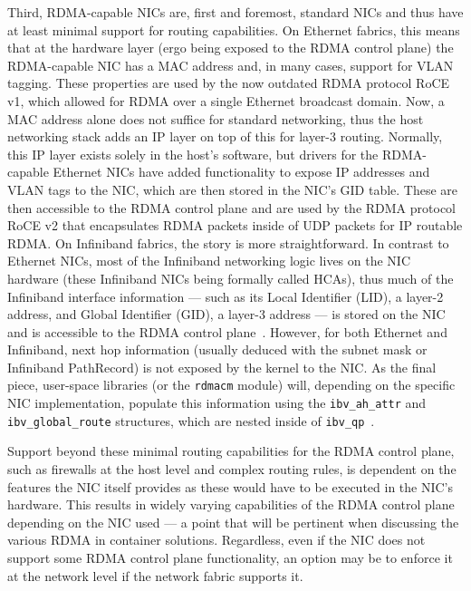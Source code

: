 \documentclass[12pt,titlepage]{article}
\begin{document}
Third, RDMA-capable NICs are, first and foremost, standard NICs and thus have at least minimal support for routing capabilities.
On Ethernet fabrics, this means that at the hardware layer (ergo being exposed to the RDMA control plane) the RDMA-capable NIC has a MAC address and, in many cases, support for VLAN tagging.
These properties are used by the now outdated RDMA protocol RoCE v1, which allowed for RDMA over a single Ethernet broadcast domain.
Now, a MAC address alone does not suffice for standard networking, thus the host networking stack adds an IP layer on top of this for layer-3 routing.
Normally, this IP layer exists solely in the host's software, but drivers for the RDMA-capable Ethernet NICs have added functionality to expose IP addresses and VLAN tags to the NIC, which are then stored in the NIC's GID table.
These are then accessible to the RDMA control plane and are used by the RDMA protocol RoCE v2 that encapsulates RDMA packets inside of UDP packets for IP routable RDMA\@.
On Infiniband fabrics, the story is more straightforward.
In contrast to Ethernet NICs, most of the Infiniband networking logic lives on the NIC hardware (these Infiniband NICs being formally called HCAs), thus much of the Infiniband interface information --- such as its Local Identifier (LID), a layer-2 address, and Global Identifier (GID), a layer-3 address --- is stored on the NIC and is accessible to the RDMA control plane~\cite{mlnxofedmanual}.
However, for both Ethernet and Infiniband, next hop information (usually deduced with the subnet mask or Infiniband PathRecord) is not exposed by the kernel to the NIC\@.
As the final piece, user-space libraries (or the \texttt{rdmacm} module) will, depending on the specific NIC implementation, populate this information using the \texttt{ibv\_ah\_attr} and \texttt{ibv\_global\_route} structures, which are nested inside of \texttt{ibv\_qp}~\cite{rdmaawareprogramming,infinibandarch,rdmacorerepo}.

Support beyond these minimal routing capabilities for the RDMA control plane, such as firewalls at the host level and complex routing rules, is dependent on the features the NIC itself provides as these would have to be executed in the NIC's hardware.
This results in widely varying capabilities of the RDMA control plane depending on the NIC used --- a point that will be pertinent when discussing the various RDMA in container solutions.
Regardless, even if the NIC does not support some RDMA control plane functionality, an option may be to enforce it at the network level if the network fabric supports it.
\end{document}
